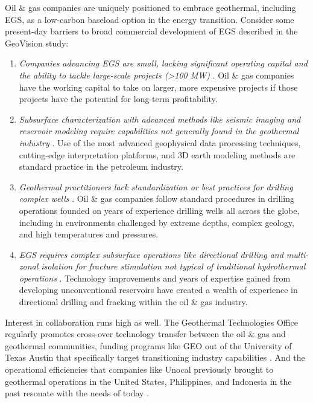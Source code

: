 Oil \& gas companies are uniquely positioned to embrace geothermal, including EGS, as a low-carbon baseload option in the energy transition. Consider some present-day barriers to broad commercial development of EGS described in the GeoVision study: 
\begin{enumerate}
    \item \textit{Companies advancing EGS are small, lacking significant operating capital and the ability to tackle large-scale projects (>100 MW)} \citep{doughty_geovision_2018}. Oil \& gas companies have the working capital to take on larger, more expensive projects if those projects have the potential for long-term profitability.
    \item \textit{Subsurface characterization with advanced methods like seismic imaging and reservoir modeling require capabilities not generally found in the geothermal industry} \citep{doughty_geovision_2018}. Use of the most advanced geophysical data processing techniques, cutting-edge interpretation platforms, and 3D earth modeling methods are standard practice in the petroleum industry.
    \item \textit{Geothermal practitioners lack standardization or best practices for drilling complex wells} \citep{doughty_geovision_2018}. Oil \& gas companies follow standard procedures in drilling operations founded on years of experience drilling wells all across the globe, including in environments challenged by extreme depths, complex geology, and high temperatures and pressures.
    \item \textit{EGS requires complex subsurface operations like directional drilling and multi-zonal isolation for fracture stimulation not typical of traditional hydrothermal operations} \citep{augustine_geovision_2019}. Technology improvements and years of expertise gained from developing unconventional reservoirs have created a wealth of experience in directional drilling and fracking within the oil \& gas industry.
\end{enumerate}

Interest in collaboration runs high as well. The Geothermal Technologies Office regularly promotes cross-over technology transfer between the oil \& gas and geothermal communities, funding programs like GEO out of the University of Texas Austin that specifically target transitioning industry capabilities \citep{hamm_geothermal_2021}. And the operational efficiencies that companies like Unocal previously brought to geothermal operations in the United States, Philippines, and Indonesia in the past resonate with the needs of today \citep{melosh_geothermal_2017,palma_dynamic_2014}.

